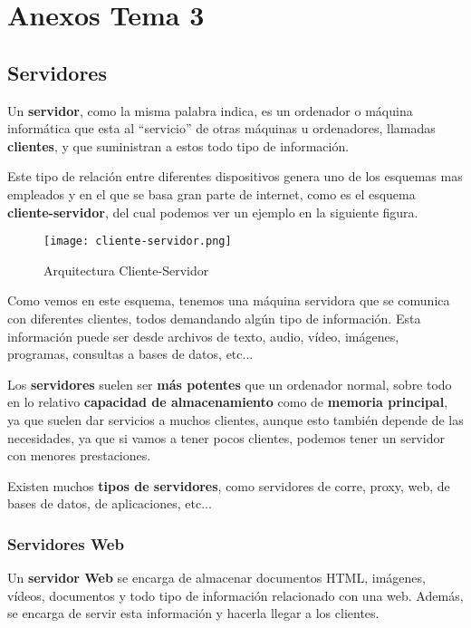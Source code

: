 \appendix


\chapter{Anexos Tema 3}

\section{Servidores}
Un \textbf{servidor}, como la misma palabra indica, es un ordenador o máquina informática que esta al ``servicio'' de otras máquinas u ordenadores, llamadas \textbf{clientes}, y que suministran a estos todo tipo de información.

Este tipo de relación entre diferentes dispositivos genera uno de los esquemas mas empleados y en el que se basa gran parte de internet, como es el esquema \textbf{cliente-servidor}, del cual podemos ver un ejemplo en la siguiente figura.

\begin{figure}[H]
    \centering
    \texttt{[image: cliente-servidor.png]}
    \caption{Arquitectura Cliente-Servidor}
\end{figure}

Como vemos en este esquema, tenemos una máquina servidora que se comunica con diferentes clientes, todos demandando algún tipo de información. Esta información puede ser desde archivos de texto, audio, vídeo, imágenes, programas, consultas a bases de datos, etc...

Los \textbf{servidores} suelen ser \textbf{más potentes} que un ordenador normal, sobre todo en lo relativo  \textbf{capacidad de almacenamiento} como de \textbf{memoria principal}, ya que suelen dar servicios a muchos clientes, aunque esto también depende de las necesidades, ya que si vamos a tener pocos clientes, podemos tener un servidor con menores prestaciones.

Existen muchos \textbf{tipos de servidores}, como servidores de corre, proxy, web, de bases de datos, de aplicaciones, etc...

\subsection{Servidores Web}
Un \textbf{servidor Web} se encarga de almacenar documentos HTML, imágenes, vídeos, documentos y todo tipo de información relacionado con una web. Además, se encarga de servir esta información y hacerla llegar a los clientes.

